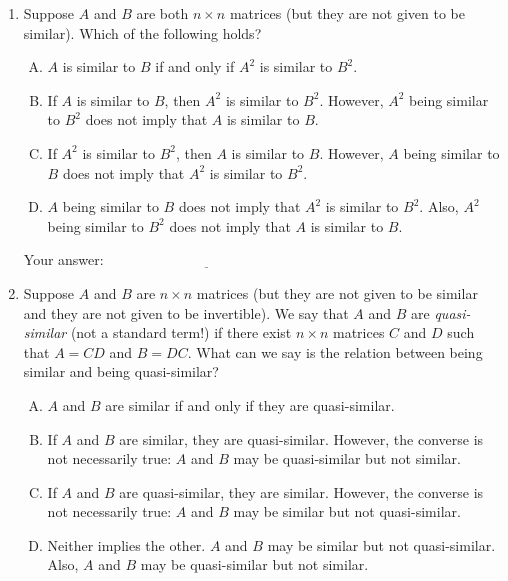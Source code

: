 \documentclass[10pt]{amsart}
\begin{document}
\begin{enumerate}
\item Suppose $A$ and $B$ are both $n \times n$ matrices (but they are
  not given to be similar). Which of the following holds?

  \begin{enumerate}[(A)]
  \item $A$ is similar to $B$ if and only if $A^2$ is similar to $B^2$.
  \item If $A$ is similar to $B$, then $A^2$ is similar to
    $B^2$. However, $A^2$ being similar to $B^2$ does not imply that
    $A$ is similar to $B$.
  \item If $A^2$ is similar to $B^2$, then $A$ is similar to
    $B$. However, $A$ being similar to $B$ does not imply that $A^2$
    is similar to $B^2$.
  \item $A$ being similar to $B$ does not imply that $A^2$ is similar
    to $B^2$. Also, $A^2$ being similar to $B^2$ does not imply that
    $A$ is similar to $B$.
  \end{enumerate}

  \vspace{0.1in}
  Your answer: $\underline{\qquad\qquad\qquad\qquad\qquad\qquad\qquad}$
  \vspace{0.1in}

\item Suppose $A$ and $B$ are $n \times n$ matrices (but they are not
  given to be similar and they are not given to be invertible). We say
  that $A$ and $B$ are {\em quasi-similar} (not a standard term!) if
  there exist $n \times n$ matrices $C$ and $D$ such that $A = CD$ and
  $B = DC$. What can we say is the relation between being similar and
  being quasi-similar?

  \begin{enumerate}[(A)]
  \item $A$ and $B$ are similar if and only if they are quasi-similar.
  \item If $A$ and $B$ are similar, they are quasi-similar. However,
    the converse is not necessarily true: $A$ and $B$ may be
    quasi-similar but not similar.
  \item If $A$ and $B$ are quasi-similar, they are similar. However,
    the converse is not necessarily true: $A$ and $B$ may be similar
    but not quasi-similar.
  \item Neither implies the other. $A$ and $B$ may be similar but not
    quasi-similar. Also, $A$ and $B$ may be quasi-similar but not
    similar.
  \end{enumerate}


\end{enumerate}
\end{document}
